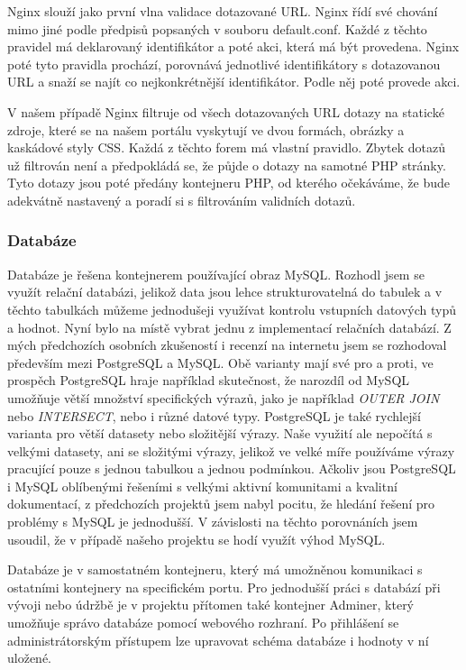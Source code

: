 Nginx slouží jako první vlna validace dotazované URL. Nginx řídí své chování mimo jiné podle předpisů popsaných v souboru default.conf. Každé z těchto pravidel má deklarovaný identifikátor a poté akci, která má být provedena. Nginx poté tyto pravidla prochází, porovnává jednotlivé identifikátory s dotazovanou URL a snaží se najít co nejkonkrétnější identifikátor. Podle něj poté provede akci.

V našem případě Nginx filtruje od všech dotazovaných URL dotazy na statické zdroje, které se na našem portálu vyskytují ve dvou formách, obrázky a kaskádové styly CSS. Každá z těchto forem má vlastní pravidlo. Zbytek dotazů už filtrován není a předpokládá se, že půjde o dotazy na samotné PHP stránky. Tyto dotazy jsou poté předány kontejneru PHP, od kterého očekáváme, že bude adekvátně nastavený a poradí si s filtrováním validních dotazů.

\subsubsection{Databáze}
Databáze je řešena kontejnerem používající obraz MySQL. Rozhodl jsem se využít relační databázi, jelikož data jsou lehce strukturovatelná do tabulek a v těchto tabulkách můžeme jednodušeji využívat kontrolu vstupních datových typů a hodnot. Nyní bylo na místě vybrat jednu z implementací relačních databází. Z mých předchozích osobních zkušeností i recenzí na internetu jsem se rozhodoval především mezi PostgreSQL a MySQL. Obě varianty mají své pro a proti, ve prospěch PostgreSQL hraje například skutečnost, že narozdíl od MySQL umožňuje větší množství specifických výrazů, jako je například \emph{OUTER JOIN} nebo \emph{INTERSECT}, nebo i různé datové typy. PostgreSQL je také rychlejší varianta pro větší datasety nebo složitější výrazy. Naše využití ale nepočítá s velkými datasety, ani se složitými výrazy, jelikož ve velké míře používáme výrazy pracující pouze s jednou tabulkou a jednou podmínkou. Ačkoliv jsou PostgreSQL i MySQL oblíbenými řešeními s velkými aktivní komunitami a kvalitní dokumentací, z předchozích projektů jsem nabyl pocitu, že hledání řešení pro problémy s MySQL je jednodušší. V závislosti na těchto porovnáních jsem usoudil, že v případě našeho projektu se hodí využít výhod MySQL.

Databáze je v samostatném kontejneru, který má umožněnou komunikaci s ostatními kontejnery na specifickém portu. Pro jednodušší práci s databází při vývoji nebo údržbě je v projektu přítomen také kontejner Adminer, který umožňuje správo databáze pomocí webového rozhraní. Po přihlášení se administrátorským přístupem lze upravovat schéma databáze i hodnoty v ní uložené.

